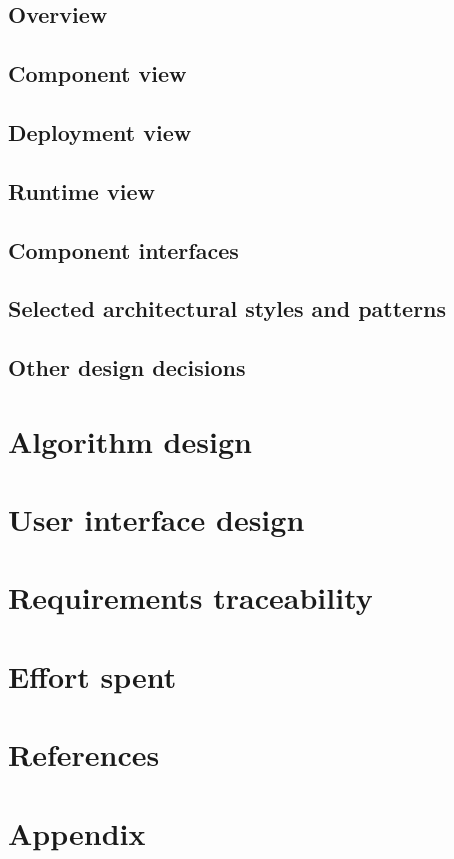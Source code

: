\documentclass[12pt, a4paper]{article}
\begin{document}
		\subsection{Overview}

		\subsection{Component view}
			

		\subsection{Deployment view}

		\subsection{Runtime view}

		\subsection{Component interfaces}

		\subsection{Selected  architectural  styles  and  patterns}

		\subsection{Other design decisions}

	\newpage
	\section{Algorithm design}

	\newpage
	\section{User interface design}

	\newpage
	\section{Requirements traceability}

	\newpage
	\section{Effort spent}

	\newpage
	\section{References}

	\newpage
	\section{Appendix}
	\listoffigures
	\listoftables
\end{document}
